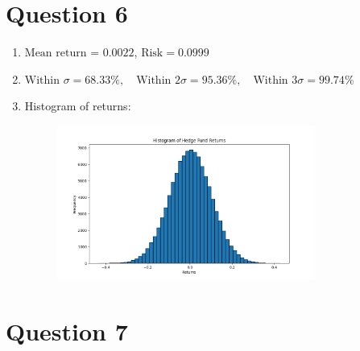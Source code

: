 \documentclass[a4paper]{article}
\begin{document}
\vspace{5mm}

\section*{Question 6}

\begin{enumerate}[label=(\alph*)]
    \item $\text{Mean return = }0.0022$, $\text{Risk} = 0.0999$

    \item $\text{Within } \sigma = 68.33\%, \quad \text{Within } 2\sigma = 95.36\%, \quad \text{Within } 3\sigma = 99.74\%$

    \item Histogram of returns:
    \begin{figure}[ht]
        \centering
        \includegraphics[width=0.8\textwidth]{q6.png}
    \end{figure}
\end{enumerate}

\newpage
\section*{Question 7}


\end{document}
